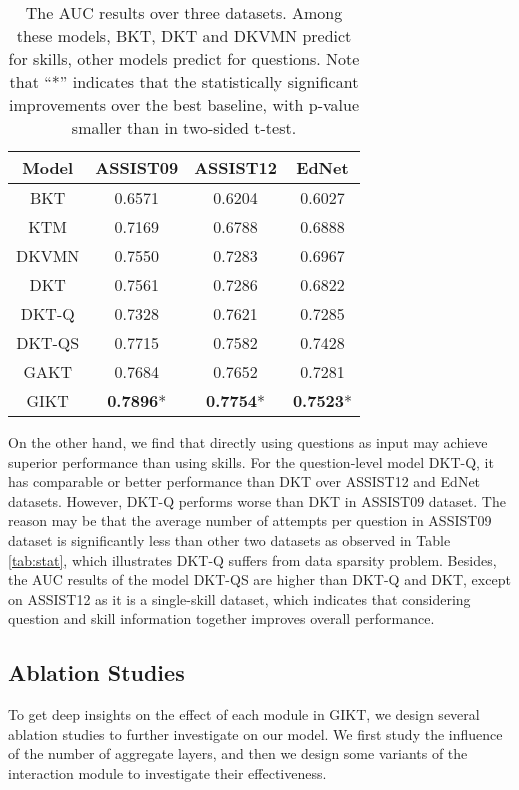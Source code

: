 \documentclass[runningheads]{llncs}
\begin{document}
\begin{table}[t]
	\centering
	\caption{The AUC results over three datasets. Among these models, BKT, DKT and DKVMN predict for skills, other models predict for questions. Note that ``*'' indicates that the statistically significant improvements over the best baseline, with p-value smaller than  in two-sided t-test.}
\begin{tabular}{cccc}
		\hline
		Model & ASSIST09 & ASSIST12 & EdNet\\
		\hline
		BKT & 0.6571 & 0.6204 & 0.6027 \\
		KTM & 0.7169 & 0.6788 & 0.6888 \\
		DKVMN & 0.7550 & 0.7283 & 0.6967  \\
		DKT & 0.7561 & 0.7286 & 0.6822 \\
		
		\hline
		DKT-Q & 0.7328 & 0.7621  &  0.7285 \\
		DKT-QS & 0.7715 & 0.7582 & 0.7428 \\
		GAKT & 0.7684 & 0.7652 & 0.7281\\
		\hline
GIKT & \textbf{0.7896}* & \textbf{0.7754}* & \textbf{0.7523}*   \\
		
		\hline
	\end{tabular}
	\label{tab:performance}
\end{table}


On the other hand, we find that directly using questions as input may achieve superior performance than using skills. For the question-level model DKT-Q, it has comparable or better performance than DKT over ASSIST12 and EdNet datasets. However, DKT-Q performs worse than DKT in ASSIST09 dataset. The reason may be that the average number of attempts per question in ASSIST09 dataset is significantly less than other two datasets as observed in Table \ref{tab:stat}, which illustrates DKT-Q suffers from data sparsity problem. 
Besides, the AUC results of the model DKT-QS are higher than DKT-Q and DKT, except on ASSIST12 as it is a single-skill dataset, which indicates that considering question and skill information together improves overall performance. 










\subsection{Ablation Studies}
\label{sec:ablation}
To get deep insights on the effect of each module in GIKT, we design several ablation studies to further investigate on our model. We first study the influence of the number of aggregate layers, and then we design some variants of the interaction module to investigate their effectiveness.
\end{document}
